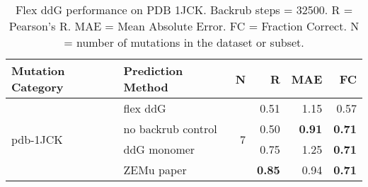 \begin{table}
  \begin{tabular}{llrrrr}
\toprule
Mutation Category &   Prediction Method &  N &    R &  MAE &   FC \\
\midrule
 \multirow{ 4}{*}{pdb-1JCK} & flex ddG & \multirow{ 4}{*}{7} & 0.51 & 1.15 & 0.57  \\
 & no backrub control & & 0.50 & \textbf{0.91} & \textbf{0.71}  \\
 & ddG monomer & & 0.75 & 1.25 & \textbf{0.71}  \\
 & ZEMu paper & & \textbf{0.85} & 0.94 & \textbf{0.71}  \\
\bottomrule
\end{tabular}
  \caption[Flex ddG performance on PDB 1JCK]{
    Flex ddG performance on PDB 1JCK. Backrub steps = 32500. R = Pearson's R. MAE = Mean Absolute Error. FC = Fraction Correct. N = number of mutations in the dataset or subset.
  } \label{tab:table-pdb-1JCK}
\end{table}
